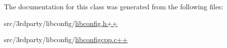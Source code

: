 The documentation for this class was generated from the following files:\begin{DoxyCompactItemize}
\item 
src/3rdparty/libconfig/\hyperlink{libconfig_8h_09_09}{libconfig.h++}\item 
src/3rdparty/libconfig/\hyperlink{libconfigcpp_8c_09_09}{libconfigcpp.c++}\end{DoxyCompactItemize}
